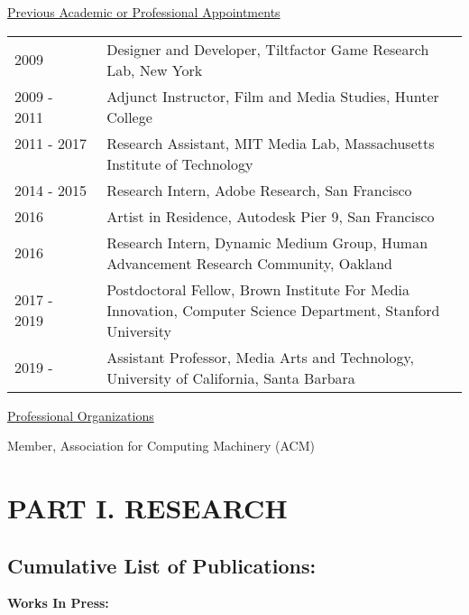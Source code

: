 \documentclass[10pt]{article}
\begin{document}
\vspace{0.5cm}
\underline{Previous Academic or Professional Appointments}
\begin{tabular}{l p{5.5in} }

2009 \ \ \ \  & Designer and Developer, Tiltfactor Game Research Lab, New York \\
2009 - 2011\ \ \ \ & Adjunct Instructor, Film and Media Studies, Hunter College \\ 
2011 - 2017 \ \ \ \ & Research Assistant, MIT Media Lab, Massachusetts Institute of Technology \\
2014 - 2015 & Research Intern, Adobe Research, San Francisco\\
2016 & Artist in Residence, Autodesk Pier 9, San Francisco \\
2016 & Research Intern, Dynamic Medium Group, Human Advancement Research Community, Oakland \\
2017 - 2019\ \ \ \ & Postdoctoral Fellow, Brown Institute For Media Innovation, Computer Science Department, Stanford University\\
2019 - \ \ \ \ & Assistant Professor, Media Arts and Technology, University of California, Santa Barbara\\ 

\end{tabular}

\vspace{0.5cm}
\underline{Professional Organizations}

Member, Association for Computing Machinery (ACM) 

\vspace{0.5cm}

\newpage

\section{\textbf{PART I.  RESEARCH}}

\vspace{0.2cm}
\subsection{{\bf Cumulative List of Publications:}}

{\setlength{\extrarowheight}{3.5pt}
}

\vspace{0.2cm}
{\bf Works In Press:}
\end{document}
